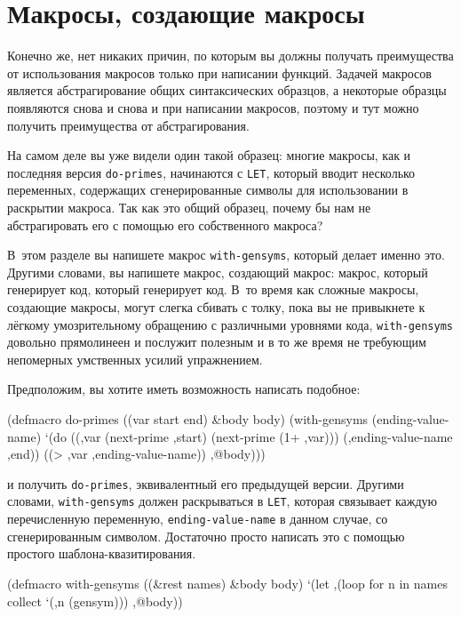 \section{Макросы, создающие макросы}

Конечно же, нет никаких причин, по которым вы должны получать преимущества от
использования макросов только при написании функций. Задачей макросов является
абстрагирование общих синтаксических образцов, а некоторые образцы появляются снова и
снова и при написании макросов, поэтому и тут можно получить преимущества от
абстрагирования.

На самом деле вы уже видели один такой образец: многие макросы, как и последняя версия
\lstinline{do-primes}, начинаются с \lstinline{LET}, который вводит несколько переменных,
содержащих сгенерированные символы для использовании в раскрытии макроса. Так как это
общий образец, почему бы нам не абстрагировать его с помощью его собственного макроса?

В~этом разделе вы напишете макрос \lstinline{with-gensyms}, который делает именно это. Другими
словами, вы напишете макрос, создающий макрос: макрос, который генерирует код, который
генерирует код. В~то время как сложные макросы, создающие макросы, могут слегка сбивать с
толку, пока вы не привыкнете к лёгкому умозрительному обращению с различными уровнями
кода, \lstinline{with-gensyms} довольно прямолинеен и послужит полезным и в то же время не
требующим непомерных умственных усилий упражнением.

Предположим, вы хотите иметь возможность написать подобное:

\begin{myverb}
(defmacro do-primes ((var start end) &body body)
  (with-gensyms (ending-value-name)
    `(do ((,var (next-prime ,start) (next-prime (1+ ,var)))
          (,ending-value-name ,end))
         ((> ,var ,ending-value-name))
       ,@body)))
\end{myverb}

\noindent{}и получить \lstinline{do-primes}, эквивалентный его предыдущей версии. Другими словами,
\lstinline{with-gensyms} должен раскрываться в \lstinline{LET}, которая связывает каждую
перечисленную переменную, \lstinline{ending-value-name} в данном случае, со сгенерированным
символом. Достаточно просто написать это с помощью простого шаблона-квазитирования.

\begin{myverb}
(defmacro with-gensyms ((&rest names) &body body)
  `(let ,(loop for n in names collect `(,n (gensym)))
     ,@body))
\end{myverb}

